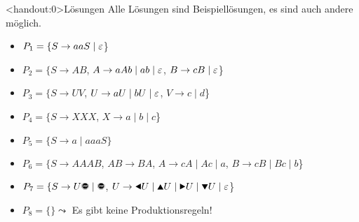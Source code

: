 {
\begin{frame}<handout:0>{Lösungen}
Alle Lösungen sind Beispiellösungen, es sind auch andere möglich.
    \begin{itemize}
        \item<1-> \alert<1>{$P_1 = \{S\rightarrow aaS\;|\;\varepsilon$\}}
        \item<2-> \alert<2>{$P_2 = \{S\rightarrow AB$, $A\rightarrow aAb \;|\; ab\; |\;\varepsilon$, $B\rightarrow cB \;|\; \varepsilon$\}}
        \item<3-> \alert<3>{$P_3 = \{S\rightarrow UV$, $U\rightarrow aU \;|\; bU \; |\; \varepsilon$, $V\rightarrow c \;|\; d$\}}
        \item<4-> \alert<4>{$P_4 = \{S\rightarrow XXX$, $X\rightarrow a \;|\; b \;|\; c$\}}
        \item<5-> \alert<5>{$P_5 = \{S\rightarrow a \;|\; aaaS\}$}
        \item<6-> \alert<6>{$P_6 = \{S\rightarrow AAAB$, $AB\rightarrow BA$, 
        $A\rightarrow cA \;|\; Ac \;|\; a$, 
        $B\rightarrow cB \;|\; Bc \;|\; b$\}}
        \item<7-> \alert<7>{$P_7 = \{S\rightarrow U\text{\Stopsign} \;|\; \text{\Stopsign}$, $U\rightarrow \text{\Rewind} U \;|\; \text{\MoveUp} U \;|\; \text{\Forward} U \;|\; \text{\MoveDown} U \;|\;\emptyWord$\}}
        \item<8-> \alert<8>{$P_8 = \{\} \leadsto$ Es gibt keine Produktionsregeln!}
    \end{itemize}
\end{frame}
}  
